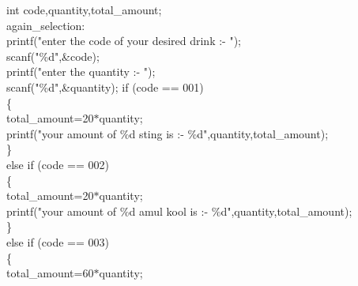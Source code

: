 \documentclass[10pt,a4paper]{article}
\begin{document}
\begin{flushleft}
    \hspace*{0.5cm} int code,quantity,total\_amount;\\
    \hspace*{0.5cm}  again\_selection:\\
    \hspace*{0.5cm}  printf("enter the code of your desired drink :- ");\\
    \hspace*{0.5cm}  scanf("\%d",\&code);\\
    \hspace*{0.5cm}  printf("enter the quantity :- ");\\
    \hspace*{0.5cm}  scanf("\%d",\&quantity);
    \hspace*{0.5cm}  if (code == 001)\\
    \hspace*{0.5cm}  \{\\
    \hspace*{0.5cm}  \hspace*{0.5cm}    total\_amount=20$\ast$quantity;\\
    \hspace*{0.5cm}  \hspace*{0.5cm}   printf("your amount of \%d sting is :- \%d",quantity,total\_amount);\\
    \hspace*{0.5cm}  \}\\
    \hspace*{0.5cm}  else if (code == 002)\\
    \hspace*{0.5cm}  \{\\
    \hspace*{0.5cm}  \hspace*{0.5cm}   total\_amount=20$\ast$quantity;\\
    \hspace*{0.5cm}  \hspace*{0.5cm}    printf("your amount of \%d amul kool is :- \%d",quantity,total\_amount);\\
    \hspace*{0.5cm}  \}\\
    \hspace*{0.5cm}  else if (code == 003)\\
    \hspace*{0.5cm}  \{\\
    \hspace*{0.5cm}  \hspace*{0.5cm}   total\_amount=60$\ast$quantity;\\

\end{flushleft}
\end{document}
